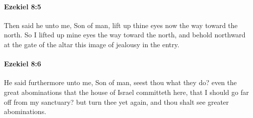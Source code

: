 		\paragraph{Ezekiel 8:5} %
			\label{EZEKIEL-8-5}

			Then said he unto me, Son of man, lift up thine eyes now the way toward the north. So I lifted up mine eyes the way toward the north, and behold northward at the gate of the altar this image of jealousy in the entry.


		\paragraph{Ezekiel 8:6} %
			\label{EZEKIEL-8-6}

			He said furthermore unto me, Son of man, seest thou what they do? even the great abominations that the house of Israel committeth here, that I should go far off from my sanctuary? but turn thee yet again, and thou shalt see greater abominations.

